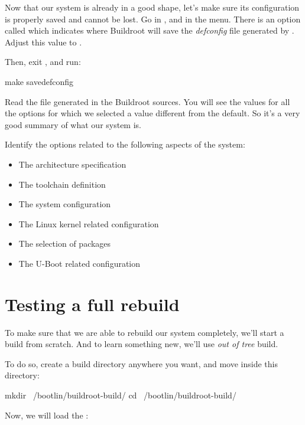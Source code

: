 Now that our system is already in a good shape, let's make sure its
configuration is properly saved and cannot be lost. Go in
, and in the  menu. There is an
option called  which indicates
where Buildroot will save the {\em defconfig} file generated by
. Adjust this value to
.

Then, exit , and run:

\begin{bashinput}
make savedefconfig
\end{bashinput}

Read the file  generated in the
Buildroot sources. You will see the values for all the options for
which we selected a value different from the default. So it's a very
good summary of what our system is.

Identify the options related to the following aspects of the system:

\begin{itemize}
\item The architecture specification
\item The toolchain definition
\item The system configuration
\item The Linux kernel related configuration
\item The selection of packages
\item The U-Boot related configuration
\end{itemize}

\section{Testing a full rebuild}

To make sure that we are able to rebuild our system completely, we'll
start a build from scratch. And to learn something new, we'll use {\em
  out of tree} build.

To do so, create a build directory anywhere you want, and move inside
this directory:

\begin{bashinput}
mkdir ~/bootlin/buildroot-build/
cd ~/bootlin/buildroot-build/
\end{bashinput}

Now, we will load the :


